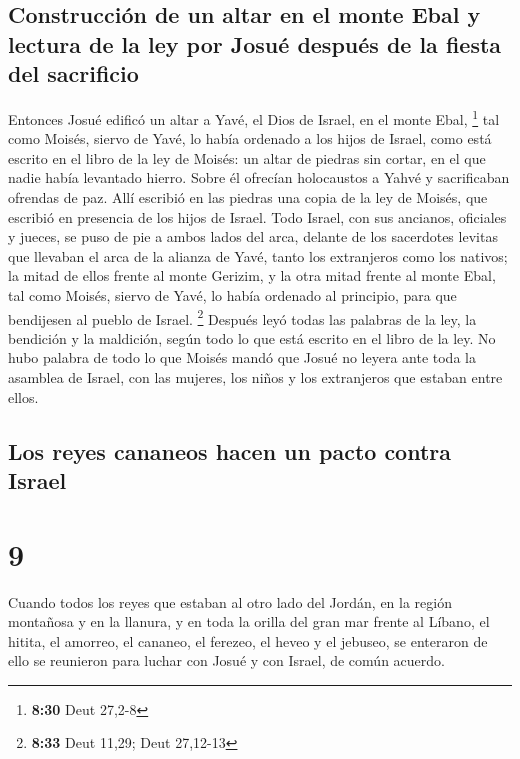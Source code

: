 \hypertarget{construcciuxf3n-de-un-altar-en-el-monte-ebal-y-lectura-de-la-ley-por-josuuxe9-despuuxe9s-de-la-fiesta-del-sacrificio}{%
\subsection{Construcción de un altar en el monte Ebal y lectura de la
ley por Josué después de la fiesta del
sacrificio}\label{construcciuxf3n-de-un-altar-en-el-monte-ebal-y-lectura-de-la-ley-por-josuuxe9-despuuxe9s-de-la-fiesta-del-sacrificio}}

 Entonces Josué edificó un altar a Yavé, el Dios de
Israel, en el monte Ebal, \footnote{\textbf{8:30} Deut 27,2-8}
 tal como Moisés, siervo de Yavé, lo había ordenado a los
hijos de Israel, como está escrito en el libro de la ley de Moisés: un
altar de piedras sin cortar, en el que nadie había levantado hierro.
Sobre él ofrecían holocaustos a Yahvé y sacrificaban ofrendas de paz.
 Allí escribió en las piedras una copia de la ley de
Moisés, que escribió en presencia de los hijos de Israel.
 Todo Israel, con sus ancianos, oficiales y jueces, se
puso de pie a ambos lados del arca, delante de los sacerdotes levitas
que llevaban el arca de la alianza de Yavé, tanto los extranjeros como
los nativos; la mitad de ellos frente al monte Gerizim, y la otra mitad
frente al monte Ebal, tal como Moisés, siervo de Yavé, lo había ordenado
al principio, para que bendijesen al pueblo de Israel. \footnote{\textbf{8:33}
  Deut 11,29; Deut 27,12-13}  Después leyó todas las
palabras de la ley, la bendición y la maldición, según todo lo que está
escrito en el libro de la ley.  No hubo palabra de todo
lo que Moisés mandó que Josué no leyera ante toda la asamblea de Israel,
con las mujeres, los niños y los extranjeros que estaban entre ellos.

\hypertarget{los-reyes-cananeos-hacen-un-pacto-contra-israel}{%
\subsection{Los reyes cananeos hacen un pacto contra
Israel}\label{los-reyes-cananeos-hacen-un-pacto-contra-israel}}

\hypertarget{section-8}{%
\section{9}\label{section-8}}

 Cuando todos los reyes que estaban al otro lado del
Jordán, en la región montañosa y en la llanura, y en toda la orilla del
gran mar frente al Líbano, el hitita, el amorreo, el cananeo, el
ferezeo, el heveo y el jebuseo, se enteraron de ello  se
reunieron para luchar con Josué y con Israel, de común acuerdo.

